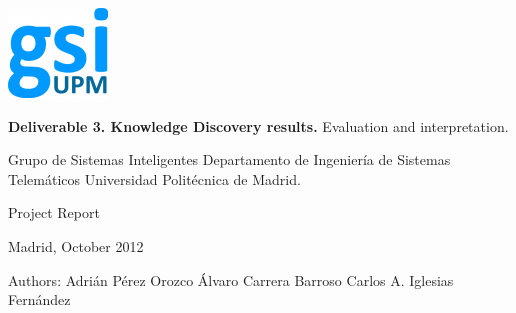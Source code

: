 \begin{titlepage}
\sffamily
\begin{flushright}

\rightskip=-1cm

\includegraphics[scale=1]{./img/logoGSI.png} 

\bigskip
\bigskip
\bigskip



\LARGE{\textbf{Deliverable 3. Knowledge Discovery results.}}
\linebreak
\large{Evaluation and interpretation.}

\bigskip

\LARGE{Grupo de Sistemas Inteligentes}
\linebreak
\large{Departamento de Ingeniería de Sistemas Telemáticos}
\linebreak
\large{Universidad Politécnica de Madrid.}

\bigskip
\bigskip
\bigskip
\bigskip
\bigskip
\bigskip

\large{Project Report}

\bigskip

\normalsize{Madrid, October 2012}

\bigskip
\bigskip
\bigskip
\bigskip
\bigskip
\bigskip
\bigskip
\bigskip
\bigskip
\bigskip
\bigskip
\bigskip
\bigskip
\bigskip
\bigskip
\bigskip

\normalsize{Authors:}
\linebreak
\large{Adrián Pérez Orozco}
\linebreak
\large{Álvaro Carrera Barroso}
\linebreak
\large{Carlos A. Iglesias Fernández}

\end{flushright}
\end{titlepage}
